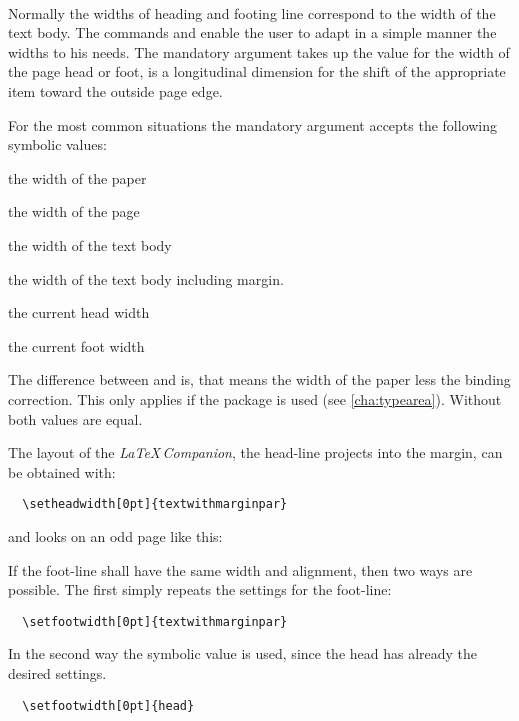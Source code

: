 \begin{Declaration}
\\
\end{Declaration}%
Normally the widths of heading and footing line
correspond to the width of the text body.
The commands  and  enable the
user to adapt in a simple manner the widths to his needs.
The mandatory argument  takes up the value for the width
of the page head or foot,
 is a longitudinal dimension for the shift of the
appropriate item toward the outside page edge.

For the most common situations the mandatory argument 
accepts the following symbolic values:
\begin{labeling}[\,--]{}
\item[\PValue{paper}] the width of the paper
\item[\PValue{page}] the width of the page
\item[\PValue{text}] the width of the text body
\item[\PValue{textwithmarginpar}] the width of the text body including margin.
\item[\PValue{head}] the current head width
\item[\PValue{foot}] the current foot width
\end{labeling}
The difference between  and  is, that
 means the width of the paper less the binding correction.
This only applies if the package 
is used (see \autoref{cha:typearea}).
Without  both values are equal.

\begin{Example}
The layout of the \emph{\LaTeX\,Companion}, the head-line projects
into the margin, can be obtained with:
\begin{lstlisting}
  \setheadwidth[0pt]{textwithmarginpar}
\end{lstlisting}
%
and looks on an odd page like this:
%
\begin{XmpTopPage}
        \thinlines{}
\end{XmpTopPage}
%
If the foot-line shall have the same width and alignment, then
two ways are possible. The first simply repeats the settings
for the foot-line:
\begin{lstlisting}
  \setfootwidth[0pt]{textwithmarginpar}
\end{lstlisting}
%
In the second way the symbolic value  is used, since the
head has already the desired settings.
\begin{lstlisting}
  \setfootwidth[0pt]{head}
\end{lstlisting}
\end{Example}

